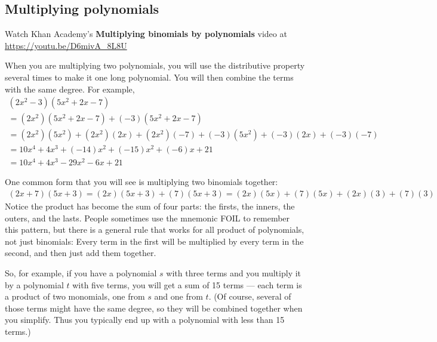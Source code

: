 \subsection{Multiplying polynomials}

Watch Khan Academy's \textbf{Multiplying binomials by polynomials} video at \url{https://youtu.be/D6mivA_8L8U}

When you are multiplying two polynomials, you will use the
distributive property several times to make it one long
polynomial. You will then combine the terms with the same degree. For
example,
\begin{multline*}
  (2x^2 - 3)(5x^2 + 2x - 7) \\
  =   (2x^2)(5x^2 + 2x - 7) + (-3)(5x^2 + 2x - 7) \\
  =   (2x^2)(5x^2) + (2x^2)(2x) + (2x^2)(-7) + (-3)(5x^2) + (-3)(2x) + (-3)(-7) \\
  =   10x^4 + 4x^3 + (-14)x^2 + (-15)x^2 + (-6)x + 21 \\
  =   10x^4 + 4x^3 - 29x^2 - 6x + 21
\end{multline*}

One common form that you will see is multiplying two binomials together:
\begin{multline*}
(2x + 7)(5x + 3) = (2x)(5x + 3) + (7)(5x+3) = (2x)(5x) + (7)(5x) + (2x)(3) + (7)(3)
\end{multline*}
Notice the product has become the sum of four parts: the firsts, the
inners, the outers, and the lasts. People sometimes use the mnemonic
FOIL to remember this pattern, but there is a general rule that works
for all product of polynomials, not just binomials: Every
term in the first will be multiplied by every term in the second, and
then just add them together.

So, for example, if you have a polynomial $s$ with three terms and you
multiply it by a polynomial $t$ with five terms, you will get a sum of
15 terms --- each term is a product of two monomials, one from $s$ and
one from $t$.  (Of course, several of those terms might have the same
degree, so they will be combined together when you simplify. Thus you
typically end up with a polynomial with less than 15 terms.)

